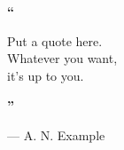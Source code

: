 
\cleardoublepage{}  %

\vspace*{\fill}

\begin{singlespace}

\begin{LARGE}
    \hspace*{3.5cm}                            %
    \textbf{\textcolor{SheffieldPurple}{``}}
    
    \vspace*{-1.3\baselineskip}
    \begin{center}
        Put a quote here.\\
        Whatever you want,\\
        it's up to you.
    \end{center}
    \vspace*{-1.3\baselineskip}
    
    \hspace*{10.5cm}                            %
    \textbf{\textcolor{SheffieldPurple}{''}}
\end{LARGE}

\vspace{\baselineskip}

\begin{large}
    \hspace*{9cm} --- A. N. Example
\end{large}

\end{singlespace}

\vspace*{\fill}
